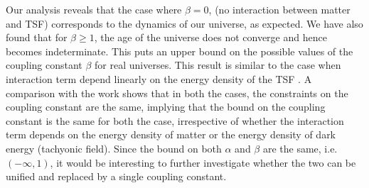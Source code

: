 \documentclass[preprint,aps,floatfix]{revtex4}
\begin{document}
    Our analysis reveals that the case where $\beta = 0$, (no interaction between matter and TSF) corresponds to the dynamics of our universe, as expected. We have also found that for $\beta \geq 1$, the age of the universe does not converge and hence becomes indeterminate. This puts an upper bound on the possible values of the coupling constant $\beta$ for real universes. This result is similar to the case when interaction term depend linearly on the energy density of the TSF \cite{kundu2021interacting}. 
%
    A comparison with the work \cite{kundu2021interacting} shows that in both the cases, the constraints on the coupling constant are the same, implying that the bound on the coupling constant is the same for both the case, irrespective of whether the interaction term depends on the energy density of matter or the energy density of dark energy (tachyonic field). Since the bound on both $\alpha$ and $\beta$ are the same, i.e. $(-\infty,1)$, it would be interesting to further investigate whether the two can be unified and replaced by a single coupling constant.
    

    




\end{document}

